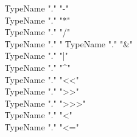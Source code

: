 \begin{bbgrammar}
    \| TypeName \xcd"." \xcd"-"\\
    \| TypeName \xcd"." \xcd"*"\\
    \| TypeName \xcd"." \xcd"/"\\
    \| TypeName \xcd"." \xcd"%
    \| TypeName \xcd"." \xcd"&"\\
    \| TypeName \xcd"." \xcd"|"\\
    \| TypeName \xcd"." \xcd"^"\\
    \| TypeName \xcd"." \xcd"<<"\\
    \| TypeName \xcd"." \xcd">>"\\
    \| TypeName \xcd"." \xcd">>>"\\
    \| TypeName \xcd"." \xcd"<"\\
    \| TypeName \xcd"." \xcd"<="\\
\end{bbgrammar}

